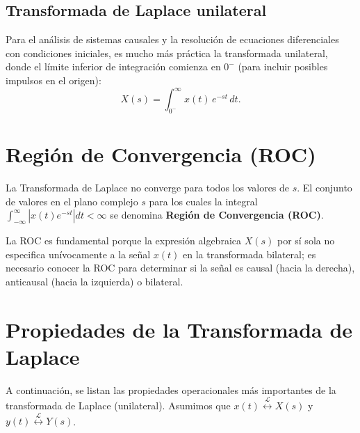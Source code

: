 \documentclass[11pt,a4paper,openany]{book}
\begin{document}
\subsection{Transformada de Laplace unilateral}

Para el análisis de sistemas causales y la resolución de ecuaciones diferenciales con condiciones iniciales, es mucho más práctica la transformada unilateral, donde el límite inferior de integración comienza en $0^{-}$ (para incluir posibles impulsos en el origen):
\begin{equation}
	X(s) = \int_{0^{-}}^{\infty} x(t) \, e^{-st} \, dt.
\end{equation}

\section{Región de Convergencia (ROC)}

La Transformada de Laplace no converge para todos los valores de $s$. El conjunto de valores en el plano complejo $s$ para los cuales la integral $\int_{-\infty}^{\infty} |x(t) e^{-st}| dt < \infty$ se denomina \textbf{Región de Convergencia (ROC)}. 

La ROC es fundamental porque la expresión algebraica $X(s)$ por sí sola no especifica unívocamente a la señal $x(t)$ en la transformada bilateral; es necesario conocer la ROC para determinar si la señal es causal (hacia la derecha), anticausal (hacia la izquierda) o bilateral.

\section{Propiedades de la Transformada de Laplace}

A continuación, se listan las propiedades operacionales más importantes de la transformada de Laplace (unilateral). Asumimos que $x(t) \stackrel{\mathcal{L}}{\longleftrightarrow} X(s)$ y $y(t) \stackrel{\mathcal{L}}{\longleftrightarrow} Y(s)$.
\end{document}
